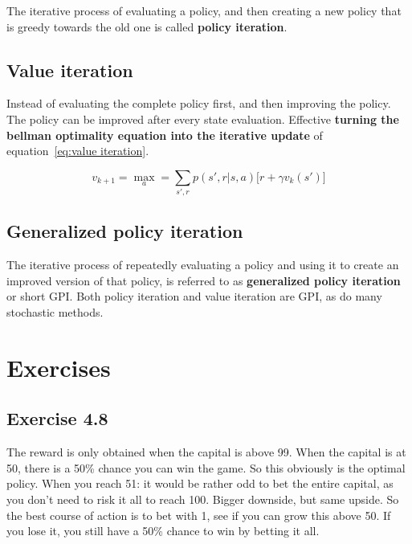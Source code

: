 The iterative process of evaluating a policy, and then creating a new policy that is greedy towards the old one is called \textbf{policy iteration}.

\subsection{Value iteration}

Instead of evaluating the complete policy first, and then improving the policy. The policy can be improved after every state evaluation. Effective \textbf{turning the bellman optimality equation into the iterative update} of equation~\ref{eq:value iteration}.

\begin{equation}
v_{k+1} = \max_a = \sum_{s',r} p(s', r| s, a)\big[ r + \gamma v_k(s')\big]
\label{eq:value iteration}
\end{equation}

\subsection{Generalized policy iteration}
The iterative process of repeatedly evaluating a policy and using it to create an improved version of that policy, is referred to as \textbf{generalized policy iteration} or short GPI. Both policy iteration and value iteration are GPI, as do many stochastic methods.


\section{Exercises}

\subsection{Exercise 4.8}
The reward is only obtained when the capital is above 99. When the capital is at 50, there is a 50\% chance you can win the game. So this obviously is the optimal policy. When you reach 51: it would be rather odd to bet the entire capital, as you don't need to risk it all to reach 100. Bigger downside, but same upside. So the best course of action is to bet with 1, see if you can grow this above 50. If you lose it, you still have a 50\% chance to win by betting it all.